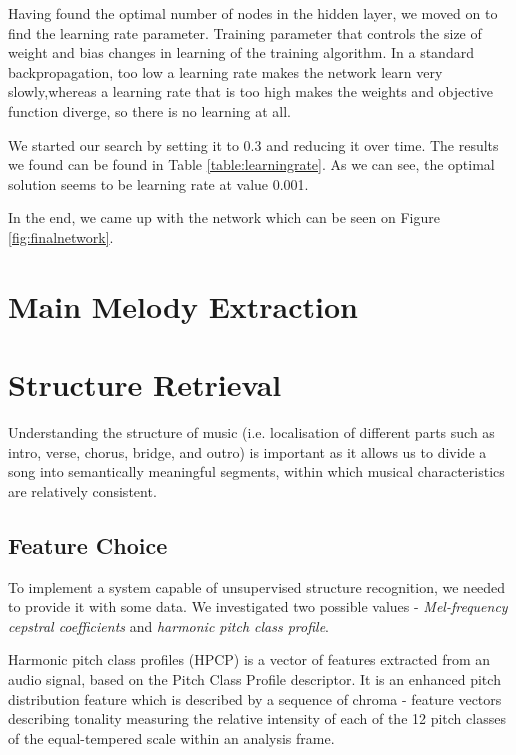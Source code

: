 Having found the optimal number of nodes in the hidden layer, we moved on to find the learning rate parameter. Training parameter that controls the size of weight and bias changes in learning of the training algorithm. In a standard backpropagation, too low a learning rate makes the network learn very slowly,whereas a learning rate that is too high makes the weights and objective function diverge, so there is no learning at all. 

We started our search by setting it to 0.3 and reducing it over time. The results we found can be found in Table \ref{table:learningrate}. As we can see, the optimal solution seems to be learning rate at value 0.001.


In the end, we came up with the network which can be seen on Figure \ref{fig:finalnetwork}.

\vspace{20pt}

\section{Main Melody Extraction}

\vspace{10pt}

\section{Structure Retrieval}

Understanding the structure of music (i.e. localisation of different parts such as intro, verse, chorus, bridge, and outro) is important as it allows us to divide a song into semantically meaningful segments, within which musical characteristics are relatively consistent.

\vspace{10pt}

\subsection{Feature Choice}

To implement a system capable of unsupervised structure recognition, we needed to provide it with some data. We investigated two possible values - \textit{Mel-frequency cepstral coefficients} and \textit{harmonic pitch class profile}.

Harmonic pitch class profiles (HPCP) is a vector of features extracted from an audio signal, based on the Pitch Class Profile descriptor. It is an enhanced pitch distribution feature which is described by a sequence of chroma - feature vectors describing tonality measuring the relative intensity of each of the 12 pitch classes of the equal-tempered scale within an analysis frame. 

